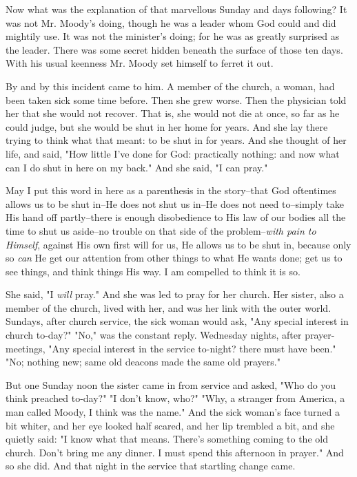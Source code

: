 Now what was the explanation of that marvellous Sunday and days following?
It was not Mr. Moody's doing, though he was a leader whom God could and
did mightily use. It was not the minister's doing; for he was as greatly
surprised as the leader. There was some secret hidden beneath the surface
of those ten days. With his usual keenness Mr. Moody set himself to ferret
it out.

By and by this incident came to him. A member of the church, a woman, had
been taken sick some time before. Then she grew worse. Then the physician
told her that she would not recover. That is, she would not die at once,
so far as he could judge, but she would be shut in her home for years.
And she lay there trying to think what that meant: to be shut in for
years. And she thought of her life, and said, "How little I've done for
God: practically nothing: and now what can I do shut in here on my back."
And she said, "I can pray."

May I put this word in here as a parenthesis in the story--that God
oftentimes allows us to be shut in--He does not shut us in--He does not
need to--simply take His hand off partly--there is enough disobedience to
His law of our bodies all the time to shut us aside--no trouble on that
side of the problem--\textit{with pain to Himself}, against His own first will
for us, He allows us to be shut in, because only so \textit{can} He get our
attention from other things to what He wants done; get us to see things,
and think things His way. I am compelled to think it is so.

She said, "I \textit{will} pray." And she was led to pray for her church. Her
sister, also a member of the church, lived with her, and was her link with
the outer world. Sundays, after church service, the sick woman would ask,
"Any special interest in church to-day?" "No," was the constant reply.
Wednesday nights, after prayer-meetings, "Any special interest in the
service to-night? there must have been." "No; nothing new; same old
deacons made the same old prayers."

But one Sunday noon the sister came in from service and asked, "Who do you
think preached to-day?" "I don't know, who?" "Why, a stranger from
America, a man called Moody, I think was the name." And the sick woman's
face turned a bit whiter, and her eye looked half scared, and her lip
trembled a bit, and she quietly said: "I know what that means. There's
something coming to the old church. Don't bring me any dinner. I must
spend this afternoon in prayer." And so she did. And that night in the
service that startling change came.

